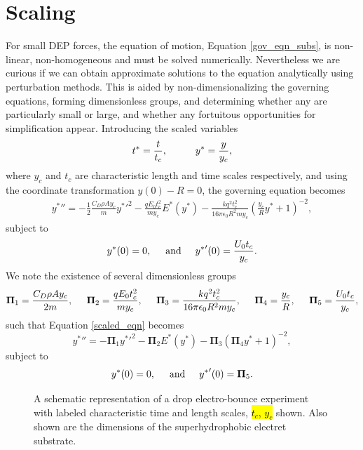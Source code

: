 \documentclass[12pt,a4paper,oneside]{book}
\begin{document}
\section{Scaling}
For small DEP forces, the equation of motion, Equation \ref{gov_eqn_subs}, is non-linear, non-homogeneous and must be solved numerically. Nevertheless we are curious if we can obtain approximate solutions to the equation analytically using perturbation methods. This is aided by non-dimensionalizing the governing equations, forming dimensionless groups, and determining whether any are particularly small or large, and whether any fortuitous opportunities for simplification appear. Introducing the scaled variables
\begin{equation}
 t^* = \frac{t}{t_c}, \hspace{10 mm} y^* = \frac{y}{y_c}, \end{equation}
where $y_c$ and $t_c$ are characteristic length and time scales respectively, and using the coordinate transformation $y(0) - R = 0$, the governing equation becomes
\begin{eqnarray}
& {y^*}'' = - \frac{1}{2} \frac{C_D \rho A y_c}{m} {y^*}'^2
- \frac{q E_0 t_c^2}{m y_c} E^* ( {y^*} ) 
- \frac{k q^2 t_c^2}{16 \pi \epsilon_0 R^2 m y_c} \left( \frac{y_c}{R} {y^*} + 1 \right)^{-2}, & \label{scaled_eqn}
\end{eqnarray}
subject to 
\begin{equation*}
{y^*}(0) = 0, \hspace{5 mm} \mbox{and} \hspace{5 mm} {y^*}'(0) = \frac{U_0 t_c}{y_c} .
\end{equation*}
We note the existence of several dimensionless groups
\[ \mathbf{\Pi}_1 = \frac{C_D \rho A y_c}{2 m}, \hspace{5 mm}
\mathbf{\Pi}_2 = \frac{q E_0 t_c^2}{m y_c}, \hspace{5 mm}
\mathbf{\Pi}_3 = \frac{k q^2 t_c^2}{16 \pi \epsilon_0 R^2 m y_c}, \hspace{5 mm}
\mathbf{\Pi}_4 = \frac{y_c}{R}, \hspace{5 mm}
\mathbf{\Pi}_5 = \frac{U_0 t_c}{y_c},\]
such that Equation \ref{scaled_eqn} becomes
\begin{equation}
\label{pi_terms}
 {y^*}'' = - \mathbf{\Pi}_1 {y^*}'^2
- \mathbf{\Pi}_2 E^* ( {y^*} ) 
- \mathbf{\Pi}_3 \left( \mathbf{\Pi}_4 {y^*} + 1 \right)^{-2},
\end{equation}
subject to
\begin{equation*}
{y^*}(0) = 0, \hspace{5 mm} \mbox{and} \hspace{5 mm} {y^*}'(0) = \mathbf{\Pi}_5 .
\end{equation*}
\begin{figure}[ht]
 \centering
  
 \caption{A schematic representation of a drop electro-bounce experiment with labeled characteristic time and length scales, \hl{$t_c$, $y_c$} shown. Also shown are the dimensions of the superhydrophobic electret substrate.\label{fig:apparatus0}}
\end{figure}
\end{document}
